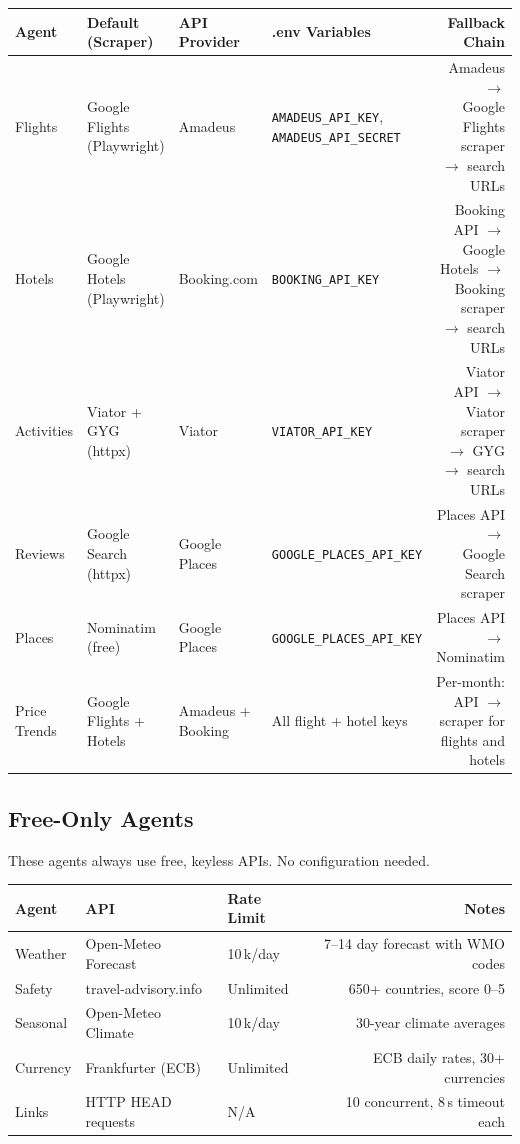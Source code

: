 \documentclass[11pt,a4paper]{article}
\begin{document}
{\small
\begin{tabularx}{\textwidth}{@{}L{1.6cm}L{2.4cm}L{1.8cm}L{2.8cm}R@{}}
\toprule
\textbf{Agent} & \textbf{Default (Scraper)} & \textbf{API Provider} & \textbf{.env Variables} & \textbf{Fallback Chain} \\
\midrule
Flights & Google Flights (Playwright) & Amadeus & \texttt{AMADEUS\_API\_KEY}, \texttt{AMADEUS\_API\_\allowbreak SECRET} & Amadeus $\to$ Google Flights scraper $\to$ search URLs \\[4pt]
Hotels & Google Hotels (Playwright) & Booking.com & \texttt{BOOKING\_API\_KEY} & Booking API $\to$ Google Hotels $\to$ Booking scraper $\to$ search URLs \\[4pt]
Activities & Viator + GYG (httpx) & Viator & \texttt{VIATOR\_API\_KEY} & Viator API $\to$ Viator scraper $\to$ GYG $\to$ search URLs \\[4pt]
Reviews & Google Search (httpx) & Google Places & \texttt{GOOGLE\_PLACES\_\allowbreak API\_KEY} & Places API $\to$ Google Search scraper \\[4pt]
Places & Nominatim (free) & Google Places & \texttt{GOOGLE\_PLACES\_\allowbreak API\_KEY} & Places API $\to$ Nominatim \\[4pt]
Price Trends & Google Flights + Hotels & Amadeus + Booking & All flight + hotel keys & Per-month: API $\to$ scraper for flights and hotels \\
\bottomrule
\end{tabularx}}

\subsection{Free-Only Agents}

These agents always use free, keyless APIs. No configuration needed.

{\small
\begin{tabularx}{\textwidth}{@{}L{2cm}L{3.2cm}L{2.4cm}R@{}}
\toprule
\textbf{Agent} & \textbf{API} & \textbf{Rate Limit} & \textbf{Notes} \\
\midrule
Weather & Open-Meteo Forecast & 10\,k/day & 7--14 day forecast with WMO codes \\[4pt]
Safety & travel-advisory.info & Unlimited & 650+ countries, score 0--5 \\[4pt]
Seasonal & Open-Meteo Climate & 10\,k/day & 30-year climate averages \\[4pt]
Currency & Frankfurter (ECB) & Unlimited & ECB daily rates, 30+ currencies \\[4pt]
Links & HTTP HEAD requests & N/A & 10 concurrent, 8\,s timeout each \\
\bottomrule
\end{tabularx}}
\end{document}
